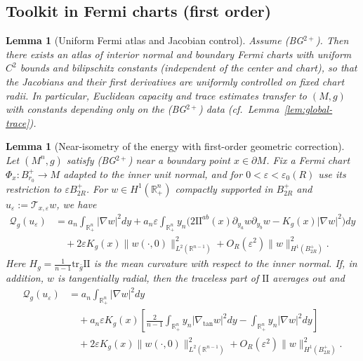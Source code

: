 \documentclass[11pt,reqno,a4paper]{amsart}
\newcommand{\R}{\mathbb{R}}
\numberwithin{equation}{section}
\theoremstyle{plain}
\newtheorem{lemma}[theorem]{Lemma}
\theoremstyle{remark}
\theoremstyle{plain}
\begin{document}
\subsection{Toolkit in Fermi charts (first order)}
\begin{lemma}[Uniform Fermi atlas and Jacobian control]\label{lem:atlas}
Assume \textup{(BG$^{2+}$)}. Then there exists an atlas of interior normal and boundary Fermi charts with uniform $C^2$ bounds and bilipschitz constants (independent of the center and chart), so that the Jacobians and their first derivatives are uniformly controlled on fixed chart radii. In particular, Euclidean capacity and trace estimates transfer to $(M,g)$ with constants depending only on the \textup{(BG$^{2+}$)} data (cf.\ Lemma~\ref{lem:global-trace}).
\end{lemma}

\begin{lemma}[Near-isometry of the energy with first-order geometric correction]\label{lem:near-iso-energy}
Let $(M^n,g)$ satisfy \textup{(BG$^{2+}$)} near a boundary point $x\in\partial M$.  Fix a Fermi chart $\Phi_x:B_{r_0}^+\to M$ adapted to the \emph{inner} unit normal, and for $0<\varepsilon<\varepsilon_0(R)$ use its restriction to $\varepsilon B_{2R}^+$.
 For $w\in H^1(\R^n_+)$ compactly supported in $B^+_{2R}$ and $u_\varepsilon:=\mathcal T_{x,\varepsilon}w$, we have
\begin{align}
\mathcal Q_g(u_\varepsilon)
&= a_n\int_{\R_+^n} |\nabla w|^2dy
+ a_n\varepsilon\int_{\R_+^n} y_n\Big(2\mathrm{II}^{ab}(x)\partial_{y_a}w\partial_{y_b}w - K_g(x)|\nabla w|^2\Big)dy \nonumber\\
&\quad + 2\varepsilon K_g(x)\|w(\cdot,0)\|_{L^2(\R^{n-1})}^2
+ O_R(\varepsilon^2)\|w\|_{H^1(B^+_{2R})}^2. \label{eq:Q-first-order}
\end{align}
Here $H_g=\frac{1}{n-1}\mathrm{tr}_{\bar g}\mathrm{II}$ is the mean curvature with respect to the inner normal. If, in addition, $w$ is tangentially radial, then the traceless part of $\mathrm{II}$ averages out and
\begin{align}
\mathcal Q_g(u_\varepsilon)
&= a_n\int_{\R_+^n} |\nabla w|^2dy \nonumber\\
&\quad + a_n\varepsilon K_g(x)\left[\frac{2}{n-1}\int_{\R_+^n} y_n|\nabla_{\tan} w|^2dy - \int_{\R_+^n} y_n|\nabla w|^2dy\right] \nonumber\\
&\quad + 2\varepsilon K_g(x)\|w(\cdot,0)\|_{L^2(\R^{n-1})}^2
+ O_R(\varepsilon^2)\|w\|_{H^1(B^+_{2R})}^2.
\label{eq:Q-isotropic}
\end{align}
\end{lemma}
\end{document}
